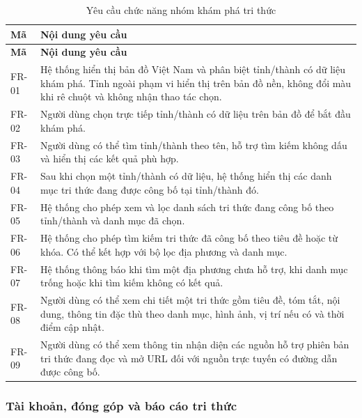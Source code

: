 \begin{longtable}{|L{20mm}|L{124mm}|}
\caption{Yêu cầu chức năng nhóm khám phá tri thức}\label{tab:chapter3-fr-1}\\\hline
{}\textbf{Mã} & \textbf{Nội dung yêu cầu}\\\hline
\endfirsthead
\hline
{}\textbf{Mã} & \textbf{Nội dung yêu cầu}\\\hline
\endhead
\endfoot
FR-01 & Hệ thống hiển thị bản đồ Việt Nam và phân biệt tỉnh/thành có dữ liệu khám phá. Tỉnh ngoài phạm vi hiển thị trên bản đồ nền, không đổi màu khi rê chuột và không nhận thao tác chọn.\\\hline
FR-02 & Người dùng chọn trực tiếp tỉnh/thành có dữ liệu trên bản đồ để bắt đầu khám phá.\\\hline
FR-03 & Người dùng có thể tìm tỉnh/thành theo tên, hỗ trợ tìm kiếm không dấu và hiển thị các kết quả phù hợp.\\\hline
FR-04 & Sau khi chọn một tỉnh/thành có dữ liệu, hệ thống hiển thị các danh mục tri thức đang được công bố tại tỉnh/thành đó.\\\hline
FR-05 & Hệ thống cho phép xem và lọc danh sách tri thức đang công bố theo tỉnh/thành và danh mục đã chọn.\\\hline
FR-06 & Hệ thống cho phép tìm kiếm tri thức đã công bố theo tiêu đề hoặc từ khóa. Có thể kết hợp với bộ lọc địa phương và danh mục.\\\hline
FR-07 & Hệ thống thông báo khi tìm một địa phương chưa hỗ trợ, khi danh mục trống hoặc khi tìm kiếm không có kết quả.\\\hline
FR-08 & Người dùng có thể xem chi tiết một tri thức gồm tiêu đề, tóm tắt, nội dung, thông tin đặc thù theo danh mục, hình ảnh, vị trí nếu có và thời điểm cập nhật.\\\hline
FR-09 & Người dùng có thể xem thông tin nhận diện các nguồn hỗ trợ phiên bản tri thức đang đọc và mở URL đối với nguồn trực tuyến có đường dẫn được công bố.\\\hline
\end{longtable}

\ReportNeedSpace{48mm}
\subsubsection{Tài khoản, đóng góp và báo cáo tri thức}

